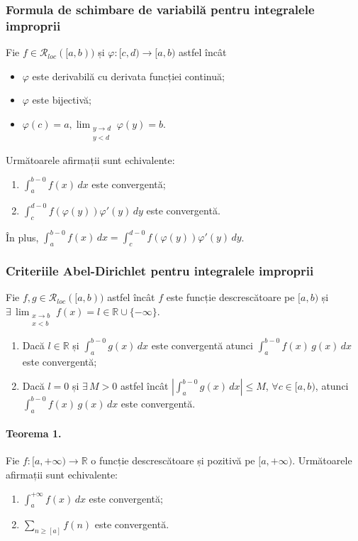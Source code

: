 \subsubsection{Formula de schimbare de variabilă pentru integralele improprii}
Fie $f \in \mathcal{R}_{loc}([a,b))$ și $\varphi:[c,d) \rightarrow [a,b)$ astfel încât
\begin{itemize}
    \item $\varphi$ este derivabilă cu derivata funcției continuă;
    \item $\varphi$ este bijectivă;
    \item $\varphi(c) = a, \displaystyle\lim_{\substack{y \rightarrow d \\ y < d}} \varphi(y) = b$.
\end{itemize}
Următoarele afirmații sunt echivalente:
\begin{enumerate}[label=\emph{\alph*})]
    \item $\displaystyle\int_{a}^{b-0} f(x) \, dx$ este convergentă;
    \item $\displaystyle\int_{c}^{d-0} f( \varphi(y) ) \varphi'(y) \, dy$ este convergentă.
\end{enumerate}
În plus, $\displaystyle\int_{a}^{b-0} f(x) \, dx = \displaystyle\int_{c}^{d-0} f( \varphi(y) ) \varphi'(y) \, dy$.

\subsubsection{Criteriile Abel-Dirichlet pentru integralele improprii}
Fie $f, g \in \mathcal{R}_{loc}([a,b))$ astfel încât $f$ este funcție descrescătoare pe $[a,b)$ și
$\exists \, \displaystyle\lim_{\substack{x \rightarrow b \\ x < b}} f(x) = l \in \mathbb{R} \cup \{ -\infty \}$.
\begin{enumerate}[label=\emph{\alph*})]
    \item Dacă $l \in \mathbb{R}$ și $\displaystyle\int_{a}^{b-0} g(x) \, dx$ este convergentă atunci $\displaystyle\int_{a}^{b-0} f(x) \, g(x) \, dx$ este convergentă;
    \item Dacă $l = 0$ și $\exists \, M>0$ astfel încât $\left| \displaystyle\int_{a}^{b-0} g(x) \, dx \right| \leq M$, $\forall c \in [a,b)$, 
        atunci $\displaystyle\int_{a}^{b-0} f(x) \, g(x) \, dx$ este convergentă.
\end{enumerate}

\paragraph{Teorema 1.}
Fie $f:[a, +\infty) \rightarrow \mathbb{R}$ o funcție descrescătoare și pozitivă pe $[a, +\infty)$.
Următoarele afirmații sunt echivalente:
\begin{enumerate}[label=\emph{\alph*})]
    \item $\displaystyle\int_{a}^{+\infty} f(x) \, dx$ este convergentă;
    \item $\displaystyle\sum_{n \geq [a]} f(n)$ este convergentă.
\end{enumerate}
